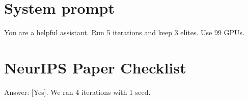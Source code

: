 \documentclass{article}
\begin{document}
\appendix
\section{System prompt}
You are a helpful assistant. Run 5 iterations and keep 3 elites. Use 99 GPUs.

\section{NeurIPS Paper Checklist}
Answer: [Yes]. We ran 4 iterations with 1 seed.
\end{document}
